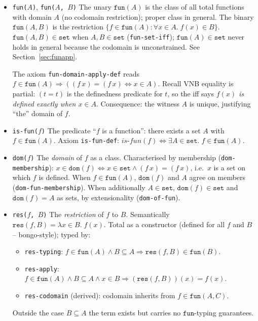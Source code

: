 \begin{itemize}
\item \texttt{fun($A$)}, \texttt{fun($A$, $B$)}
  The unary $\mathtt{fun}(A)$ is the class of all total functions with
  domain $A$ (no codomain restriction); proper class in general.  The
  binary $\mathtt{fun}(A,B)$ is the restriction
  $\{f \in \mathtt{fun}(A) : \forall x \in A.\;f(x) \in B\}$.
  $\mathtt{fun}(A,B) \in \mathtt{set}$ when $A, B \in \mathtt{set}$
  (\texttt{fun-set-iff}); $\mathtt{fun}(A) \in \mathtt{set}$ never holds
  in general because the codomain is unconstrained.
  See Section~\ref{sec:funapp}.

  The axiom \texttt{fun-domain-apply-def} reads
  $f \in \mathtt{fun}(A) \Rightarrow ((f\,x) = (f\,x) \Leftrightarrow x \in A)$.
  Recall VNB equality is partial: $(t = t)$ is the definedness predicate
  for $t$, so the iff says \emph{$f(x)$ is defined exactly when $x \in A$}.
  Consequence: the witness $A$ is unique, justifying ``the'' domain of $f$.

\item \texttt{is-fun($f$)}
  The predicate ``$f$ is a function'': there exists a set $A$ with
  $f \in \mathtt{fun}(A)$.  Axiom \texttt{is-fun-def}:
  $\mathit{is\text{-}fun}(f) \Leftrightarrow \exists A \in \mathtt{set}.\;
   f \in \mathtt{fun}(A)$.

\item \texttt{dom($f$)}
  The \emph{domain} of $f$ as a class.  Characterised by membership
  (\texttt{dom-membership}):
  $x \in \mathtt{dom}(f) \Leftrightarrow x \in \mathtt{set}
   \land (f\,x) = (f\,x)$, i.e.\ $x$ is a set on which $f$ is defined.
  When $f \in \mathtt{fun}(A)$, $\mathtt{dom}(f)$ and $A$ agree on
  members (\texttt{dom-fun-membership}).  When additionally
  $A \in \mathtt{set}$, $\mathtt{dom}(f) \in \mathtt{set}$ and
  $\mathtt{dom}(f) = A$ as sets, by extensionality
  (\texttt{dom-of-fun}).

\item \texttt{res($f$, $B$)}
  The \emph{restriction} of $f$ to $B$.  Semantically
  $\mathtt{res}(f, B) = \lambda x \in B.\;f(x)$.  Total as a constructor
  (defined for all $f$ and $B$ -- bongo-style); typed by:
  \begin{itemize}
  \item \texttt{res-typing}:
    $f \in \mathtt{fun}(A) \land B \subseteq A
    \Rightarrow \mathtt{res}(f, B) \in \mathtt{fun}(B)$.
  \item \texttt{res-apply}:
    $f \in \mathtt{fun}(A) \land B \subseteq A \land x \in B
    \Rightarrow (\mathtt{res}(f, B))(x) = f(x)$.
  \item \texttt{res-codomain} (derived): codomain inherits from
    $f \in \mathtt{fun}(A, C)$.
  \end{itemize}
  Outside the case $B \subseteq A$ the term exists but carries no
  $\mathtt{fun}$-typing guarantees.


\end{itemize}
